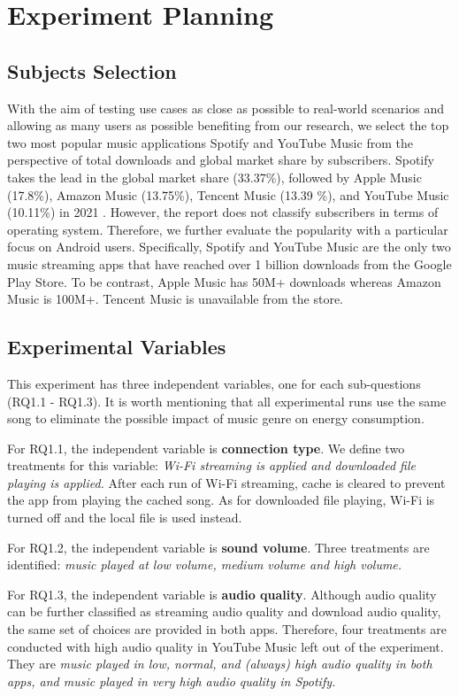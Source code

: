 \section{Experiment Planning}

\subsection{Subjects Selection}
{\color{blue}With the aim of testing use cases as close as possible to real-world scenarios and allowing as many users as possible benefiting from our research, we select the top two most popular music applications Spotify and YouTube Music from the perspective of total downloads and global market share by subscribers. Spotify takes the lead in the global market share (33.37\%), followed by Apple Music (17.8\%), Amazon Music (13.75\%), Tencent Music (13.39 \%), and YouTube Music (10.11\%) in 2021 \cite{16}. However, the report does not classify subscribers in terms of operating system. Therefore, we further evaluate the popularity with a particular focus on Android users. Specifically, Spotify and YouTube Music are the only two music streaming apps that have reached over 1 billion downloads from the Google Play Store. To be contrast, Apple Music has 50M+ downloads whereas Amazon Music is 100M+. Tencent Music is unavailable from the store. 
}

\subsection{Experimental Variables}
This experiment has three independent variables, one for each sub-questions (RQ1.1 - RQ1.3). It is worth mentioning that all experimental runs use the same song to eliminate the possible impact of music genre on energy consumption.

For RQ1.1, the independent variable is {\color{blue}\textbf{connection type}}. We define two treatments for this variable: \emph{Wi-Fi streaming is applied and downloaded file playing is applied.} After each run of Wi-Fi streaming, cache is cleared to prevent the app from playing the cached song. As for downloaded file playing, Wi-Fi is turned off and the local file is used instead.  

{\color{blue}For RQ1.2, the independent variable is \textbf{sound volume}. Three treatments are identified: \emph{music played at low volume, medium volume and high volume.}} 

For RQ1.3, the independent variable is \textbf{audio quality}. {\color{blue}Although audio quality can be further classified as streaming audio quality and download audio quality, the same set of choices are provided in both apps. Therefore, four treatments are conducted with high audio quality in YouTube Music left out of the experiment. They are \emph{music played in low, normal, and (always) high audio quality in both apps, and music played in very high audio quality in Spotify.  }}   


